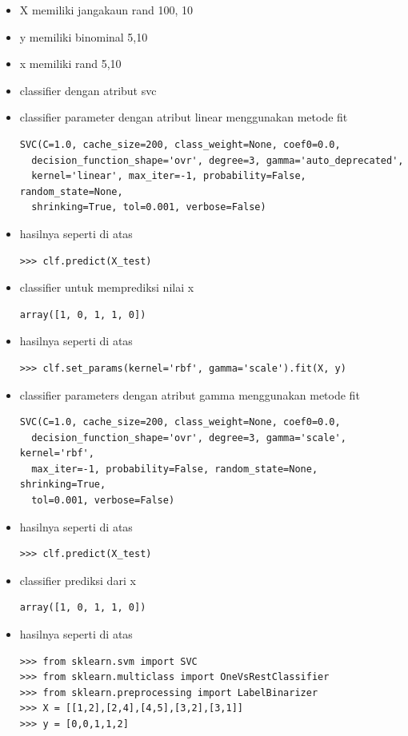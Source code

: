 \begin{itemize}
\item X memiliki jangakaun rand 100, 10
\item y memiliki binominal 5,10
\item x memiliki rand 5,10
\item classifier dengan atribut svc
\item classifier parameter dengan atribut linear menggunakan metode fit
\begin{verbatim}
SVC(C=1.0, cache_size=200, class_weight=None, coef0=0.0,
  decision_function_shape='ovr', degree=3, gamma='auto_deprecated',
  kernel='linear', max_iter=-1, probability=False, random_state=None,
  shrinking=True, tol=0.001, verbose=False)
\end{verbatim}
\item hasilnya seperti di atas
\begin{verbatim}
>>> clf.predict(X_test)
\end{verbatim}
\item classifier untuk memprediksi nilai x
\begin{verbatim}
array([1, 0, 1, 1, 0])
\end{verbatim}
\item hasilnya seperti di atas
\begin{verbatim}
>>> clf.set_params(kernel='rbf', gamma='scale').fit(X, y)
\end{verbatim}
\item classifier parameters dengan atribut gamma menggunakan metode fit
\begin{verbatim}
SVC(C=1.0, cache_size=200, class_weight=None, coef0=0.0,
  decision_function_shape='ovr', degree=3, gamma='scale', kernel='rbf',
  max_iter=-1, probability=False, random_state=None, shrinking=True,
  tol=0.001, verbose=False)
\end{verbatim}
\item hasilnya seperti di atas
\begin{verbatim}
>>> clf.predict(X_test)
\end{verbatim}
\item classifier prediksi dari x 
\begin{verbatim}
array([1, 0, 1, 1, 0])
\end{verbatim}
\item hasilnya seperti di atas
\begin{verbatim}
>>> from sklearn.svm import SVC
>>> from sklearn.multiclass import OneVsRestClassifier
>>> from sklearn.preprocessing import LabelBinarizer
>>> X = [[1,2],[2,4],[4,5],[3,2],[3,1]]
>>> y = [0,0,1,1,2]

\end{verbatim}
\end{itemize}
